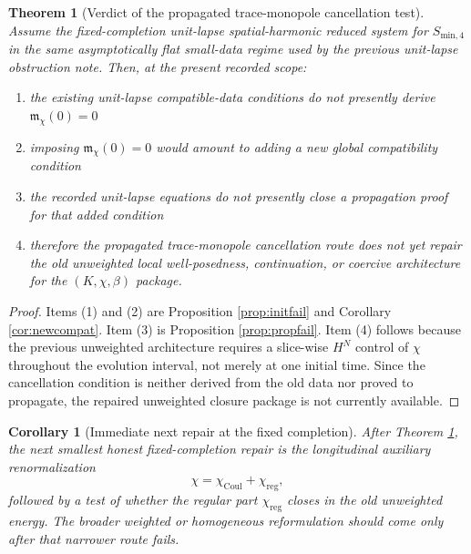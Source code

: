 \documentclass[11pt]{article}
\newtheorem{corollary}{Corollary}
\newtheorem{theorem}{Theorem}
\begin{document}
\begin{theorem}[Verdict of the propagated trace-monopole cancellation test]
\label{thm:verdict}
Assume the fixed-completion unit-lapse spatial-harmonic reduced system for \(S_{\mathrm{min},4}\) in the same asymptotically flat small-data regime used by the previous unit-lapse obstruction note. Then, at the present recorded scope:
\begin{enumerate}
    \item the existing unit-lapse compatible-data conditions do not presently derive \(\mathfrak m_\chi(0)=0\)
    \item imposing \(\mathfrak m_\chi(0)=0\) would amount to adding a new global compatibility condition
    \item the recorded unit-lapse equations do not presently close a propagation proof for that added condition
    \item therefore the propagated trace-monopole cancellation route does not yet repair the old unweighted local well-posedness, continuation, or coercive architecture for the \((K,\chi,\beta)\) package.
\end{enumerate}
\end{theorem}

\begin{proof}
Items (1) and (2) are Proposition \ref{prop:initfail} and Corollary \ref{cor:newcompat}. Item (3) is Proposition \ref{prop:propfail}. Item (4) follows because the previous unweighted architecture requires a slice-wise \(H^N\) control of \(\chi\) throughout the evolution interval, not merely at one initial time. Since the cancellation condition is neither derived from the old data nor proved to propagate, the repaired unweighted closure package is not currently available.
\end{proof}

\begin{corollary}[Immediate next repair at the fixed completion]
\label{cor:nextrepair}
After Theorem \ref{thm:verdict}, the next smallest honest fixed-completion repair is the longitudinal auxiliary renormalization
\begin{equation}
\chi=\chi_{\mathrm{Coul}}+\chi_{\mathrm{reg}},
\label{eq:chisplit}
\end{equation}
followed by a test of whether the regular part \(\chi_{\mathrm{reg}}\) closes in the old unweighted energy. The broader weighted or homogeneous reformulation should come only after that narrower route fails.
\end{corollary}
\end{document}
